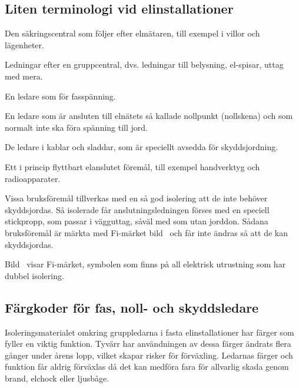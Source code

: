 \subsection{Liten terminologi vid elinstallationer}
\begin{description}[style=nextline]
\item[Gruppcentral] Den säkringscentral som följer efter elmätaren,
  till exempel i villor och lägenheter.

\item[Gruppledningar] Ledningar efter en gruppcentral, dvs.
  ledningar till belysning, el-spisar, uttag med mera.

\item[Fasledare] En ledare som för fasspänning.

\item[Nolledare (N-ledare)] En ledare som är ansluten till elnätets så kallade
  nollpunkt (nollskena) och som normalt inte ska föra spänning till jord.

\item[Skyddsledare (PE-ledare)] De ledare i kablar och sladdar, som är
  speciellt avsedda för skyddsjordning.

\item[Bruksföremål] Ett i princip flyttbart elanslutet föremål,
  till exempel handverktyg och radioapparater.

\item[Förstärkt isolering] Vissa bruksföremål tillverkas med en så god
  isolering att de inte behöver skyddsjordas.
  Så isolerade får anslutningsledningen förses med en speciell stickpropp,
  som passar i vägguttag, såväl med som utan jorddon.
  Sådana bruksföremål är märkta med Fi-märket bild~ och får
  inte ändras så att de kan skyddsjordas.
\end{description}


Bild~ visar Fi-märket, symbolen som finns på all elektrisk
utrustning som har dubbel isolering.

\subsection{Färgkoder för fas, noll- och skyddsledare}

Isoleringsmaterialet omkring gruppledarna i fasta elinstallationer har
färger som fyller en viktig funktion.
Tyvärr har användningen av dessa färger ändrats flera gånger under årens lopp,
vilket skapar risker för förväxling.
Ledarnas färger och funktion får aldrig förväxlas då det kan medföra fara för
allvarlig skada genom brand, elchock eller ljusbåge.

